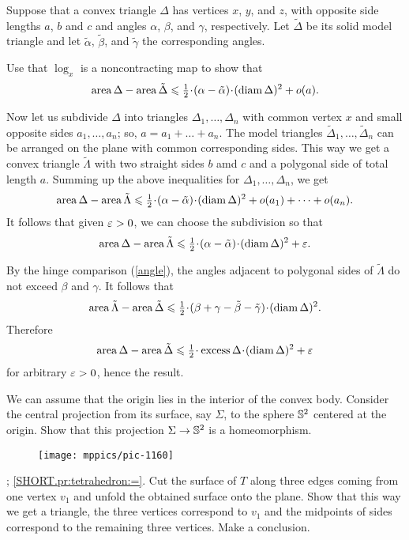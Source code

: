 Suppose that a convex triangle $\Delta$ has vertices $x$, $y$, and $z$, with opposite side lengths $a$, $b$ and $c$ and angles $\alpha$, $\beta$, and $\gamma$, respectively.
Let $\tilde\Delta$ be its solid model triangle and let $\tilde \alpha$, $\tilde \beta$, and $\tilde \gamma$ the corresponding angles.

Use that $\log_x$ is a noncontracting map to show that
\[\area\Delta-\area\tilde\Delta\le \tfrac12\cdot(\alpha-\tilde\alpha)\cdot (\diam \Delta)^2+o(a).\]

Now let us subdivide $\Delta$ into triangles $\Delta_1,\dots,\Delta_n$ with common vertex $x$ and small opposite sides $a_1,\dots,a_n$; so, $a=a_1+\dots+a_n$.
The model triangles $\tilde\Delta_1,\dots,\tilde\Delta_n$ can be arranged on the plane with common corresponding sides.
This way we get a convex triangle $\tilde\Lambda$ with two straight sides $b$ amd $c$ and a polygonal side of total length $a$.
Summing up the above inequalities for $\Delta_1,\dots,\Delta_n$, we get
\[\area\Delta-\area\tilde\Lambda\le \tfrac12\cdot(\alpha-\tilde\alpha)\cdot (\diam\Delta)^2+o(a_1)+\dots +o(a_n).\]
It follows that given $\varepsilon>0$, we can choose the subdivision so that
\[\area\Delta-\area\tilde\Lambda\le \tfrac12\cdot(\alpha-\tilde\alpha)\cdot (\diam\Delta)^2+\eps.\]

By the hinge comparison (\ref{angle}), the angles adjacent to polygonal sides of $\tilde\Lambda$ do not exceed $\beta$ and $\gamma$.
It follows that
\[\area\tilde\Lambda-\area\tilde\Delta\le \tfrac12\cdot(\beta+\gamma-\tilde\beta-\tilde\gamma)\cdot (\diam \Delta)^2.\]
Therefore
\[\area\Delta-\area\tilde\Delta\le \tfrac12\cdot\excess\Delta\cdot (\diam \Delta)^2+\eps\]
for arbitrary $\varepsilon>0$, hence the result.



We can assume that the origin lies in the interior of the convex body.
Consider the central projection from its surface, say $\Sigma$, to the sphere $\mathbb{S}^2$ centered at the origin.
Show that this projection $\Sigma\to \mathbb{S}^2$ is a homeomorphism.

\begin{wrapfigure}{r}{25mm}
\vskip-6mm
\centering
\texttt{[image: mppics/pic-1160]}
\vskip-0mm
\end{wrapfigure}

\parbf{\ref{pr:tetrahedron}}; \ref{SHORT.pr:tetrahedron:=}.
Cut the surface of $T$ along three edges coming from one vertex $v_1$ and unfold the obtained surface onto the plane.
Show that this way we get a triangle, the three vertices correspond to $v_1$ and the midpoints of sides correspond to the remaining three vertices.
Make a conclusion.

